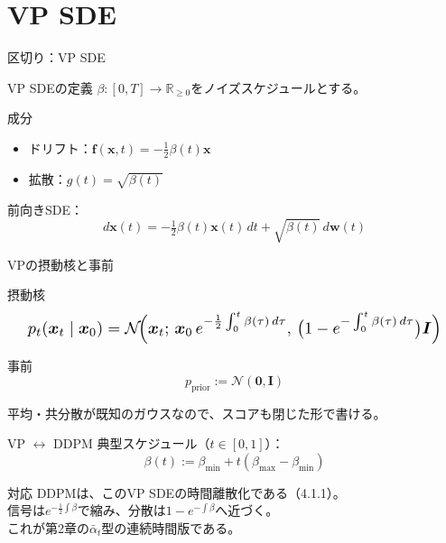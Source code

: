 \section{VP SDE}
\asmain
\begin{frame}{区切り：VP SDE}
    \tableofcontents[currentsection]
\end{frame}
\asmain
\begin{frame}{VP SDEの定義}
    $\beta:[0,T]\to\mathbb{R}_{\ge 0}$をノイズスケジュールとする。
    \begin{block}{成分}
        \begin{itemize}
            \item ドリフト：$\bm{f}(\bm{x},t)=-\tfrac12\beta(t)\bm{x}$
            \item 拡散：$g(t)=\sqrt{\beta(t)}$
        \end{itemize}
    \end{block}
    前向きSDE：
    \[
        d\bm{x}(t)
        =
        -\tfrac12\beta(t)\bm{x}(t)\,dt
        +
        \sqrt{\beta(t)}\,d\bm{w}(t)
        \tag{4.4.2}
    \]
\end{frame}
\asmain
\begin{frame}{VPの摂動核と事前}
    \begin{block}{摂動核}
        \[
            \resizebox{0.95\textwidth}{!}{$
            p_t(\bm{x}_t\mid\bm{x}_0)
            =
            \mathcal{N}\!\Bigl(
                \bm{x}_t;\,
                \bm{x}_0\,e^{-\frac12\int_0^t\beta(\tau)\,d\tau},\,
                \bigl(1-e^{-\int_0^t\beta(\tau)\,d\tau}\bigr)\bm{I}
            \Bigr)
            $}
        \]
    \end{block}
    \begin{block}{事前}
        \[
            p_{\mathrm{prior}}:=\mathcal{N}(\bm{0},\bm{I})
        \]
    \end{block}
    平均・共分散が既知のガウスなので、スコアも閉じた形で書ける。
\end{frame}
\asmain
\begin{frame}{VP $\leftrightarrow$ DDPM}
    典型スケジュール（$t\in[0,1]$）：
    \[
        \beta(t)
        :=
        \beta_{\min}+t(\beta_{\max}-\beta_{\min})
    \]
    \begin{block}{対応}
        DDPMは、このVP SDEの時間離散化である（4.1.1）。\\
        信号は$e^{-\frac12\int\beta}$で縮み、分散は$1-e^{-\int\beta}$へ近づく。\\
        これが第2章の$\bar\alpha_t$型の連続時間版である。
    \end{block}
\end{frame}
